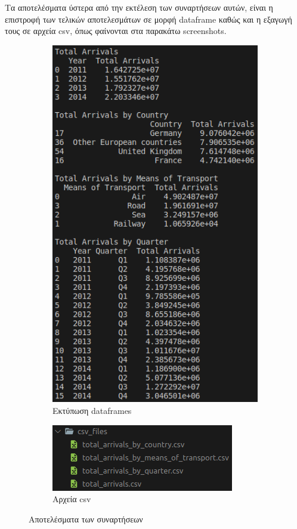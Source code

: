\documentclass[a4paper]{article}
\begin{document}

Τα αποτελέσματα ύστερα από την εκτέλεση των συναρτήσεων αυτών, είναι η επιστροφή των τελικών αποτελεσμάτων σε μορφή \textlatin{dataframe} καθώς και η εξαγωγή τους σε αρχεία \textlatin{csv}, όπως φαίνονται στα παρακάτω \textlatin{screenshots}.


\begin{figure}[h]
\centering
\begin{subfigure}[b]{0.48\textwidth}
\centering
\includegraphics[scale=0.45]{dataframes} 
\caption{Εκτύπωση \textlatin{dataframes}}
\label{fig:print_dataframe}
\end{subfigure}
\hfill
\begin{subfigure}[b]{0.48\textwidth}
\centering
\includegraphics[scale=0.45]{csv}
\caption{Αρχεία \textlatin{csv}}
\label{fig:csv_files}
\end{subfigure}

\caption{Αποτελέσματα των συναρτήσεων}
\label{fig:dataframe_results}
\end{figure}
\end{document}
